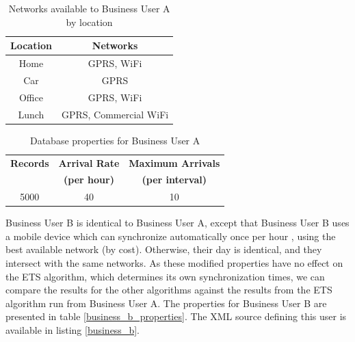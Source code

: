 \begin{table}[htdp]
\begin{center}
\begin{tabular}{|c|c|}
\hline
\textbf{Location} & \textbf{Networks} \\
\hline
Home & GPRS, WiFi \\
\hline
Car & GPRS \\
\hline
Office & GPRS, WiFi \\
\hline
Lunch & GPRS, Commercial WiFi \\
\hline
\end{tabular}
\end{center}
\caption{Networks available to Business User A by location}
\label{business_a_networks}
\end{table}

\begin{table}[htdp]
\begin{center}
\begin{tabular}{|c|c|c|}
\hline
\textbf{Records} & \textbf{Arrival Rate} & \textbf{Maximum Arrivals} \\
 & \textbf{(per hour)} & \textbf{(per interval)} \\
\hline
5000 & 40 & 10 \\
\hline
\end{tabular}
\end{center}
\caption{Database properties for Business User A}
\label{business_a_database}
\end{table}

Business User B is identical to Business User A, except that Business User B uses a mobile device which can synchronize automatically once per hour \cite{optSyncTimes}, using the best available network (by cost).  Otherwise, their day is identical, and they intersect with the same networks.  As these modified properties have no effect on the ETS algorithm, which determines its own synchronization times, we can compare the results for the other algorithms against the results from the ETS algorithm run from Business User A.  The properties for Business User B are presented in table \ref{business_b_properties}. The XML source defining this user is available in listing \ref{business_b}.

